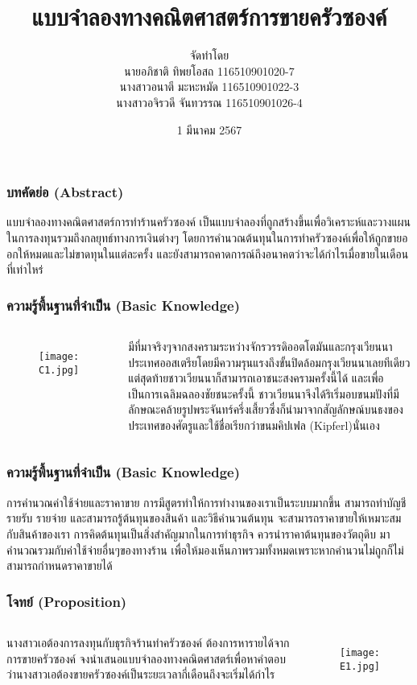 \documentclass{beamer}
\title{แบบจำลองทางคณิตศาสตร์การขายครัวซองค์}
\author{จัดทำโดย \\
	นายอภิชาติ ทิพยโอสถ 116510901020-7 \\
	นางสาวอนาตี มะหะหมัด 116510901022-3 \\
	นางสาวอจิรวดี จันทวรรณ 116510901026-4}
\date{1 มีนาคม 2567}
\begin{document}
\begin{frame}
\maketitle
\end{frame}

\begin{frame}
\frametitle{บทคัดย่อ (Abstract)}
แบบจำลองทางคณิตศาสตร์การทำร้านครัวซองค์ เป็นแบบจําลองที่ถูกสร้างขึ้นเพื่อวิเคราะห์และวางแผนในการลงทุนรวมถึงกลยุทธ์ทางการเงินต่างๆ โดยการคํานวณต้นทุนในการทําครัวซองค์เพื่อให้ถูกขายออกให้หมดและไม่ขาดทุนในแต่ละครั้ง และยังสามารถคาดการณ์ถึงอนาคตว่าจะได้กำไรเมื่อขายในเดือนที่เท่าไหร่
\end{frame}

\begin{frame}
\frametitle{ความรู้พื้นฐานที่จำเป็น (Basic Knowledge)}
\begin{columns}
\begin{figure}[h!]
\texttt{[image: C1.jpg]}
\centering
\end{figure}
มีที่มาจริงๆจากสงครามระหว่างจักรวรรดิออตโตมันและกรุงเวียนนาประเทศออสเตรียโดยมีความรุนแรงถึงขั้นปิดล้อมกรุงเวียนนาเลยทีเดียวแต่สุดท้ายชาวเวียนนาก็สามารถเอาชนะสงครามครั้งนี้ได้ และเพื่อเป็นการเฉลิมฉลองชัยชนะครั้งนี้ ชาวเวียนนาจึงได้ริเริ่มอบขนมปังที่มีลักษณะคล้ายรูปพระจันทร์ครึ่งเสี้ยวซึ่งก็นํามาจากสัญลักษณ์บนธงของประเทศของศัตรูและใช้ชื่อเรียกว่าขนมคิปเฟล (Kipferl)นั่นเอง
\end{columns}
\end{frame}

\begin{frame}
\frametitle{ความรู้พื้นฐานที่จำเป็น (Basic Knowledge)}
การคำนวณค่าใช้จ่ายและราคาขาย 
การมีสูตรทำให้การทำงานของเราเป็นระบบมากขึ้น สามารถทำบัญชีรายรับ รายจ่าย และสามารถรู้ต้นทุนของสินค้า และวิธีคำนวนต้นทุน จะสามารถราคาขายให้เหมาะสมกับสินค้าของเรา การคิดต้นทุนเป็นสิ่งสำคัญมากในการทำธุรกิจ ควรนำราคาต้นทุนของวัตถุดิบ มาคำนวณรวมกับค่าใช้จ่ายอื่นๆของทางร้าน เพื่อให้มองเห็นภาพรวมทั้งหมดเพราะหากคำนวนไม่ถูกก็ไม่สามารถกำหนดราคาขายได้
\end{frame}

\begin{frame}
\frametitle{โจทย์ (Proposition)}
\begin{columns}
นางสาวเอต้องการลงทุนกับธุรกิจร้านทำครัวซองค์ ต้องการหารายได้จากการขายครัวซองค์ จงนําเสนอแบบจําลองทางคณิตศาสตร์เพื่อหาคําตอบว่านางสาวเอต้องขายครัวซองค์เป็นระยะเวลากี่เดือนถึงจะเริ่มได้กําไร
\begin{figure}[h!]
\texttt{[image: E1.jpg]}
\centering
\end{figure}
\end{columns}
\end{frame}
\end{document}
